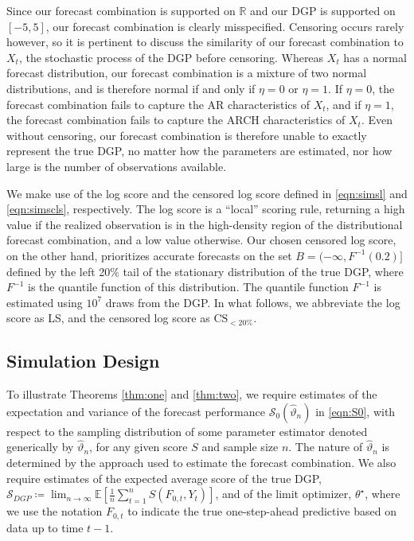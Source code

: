 \documentclass[12pt]{article}
\theoremstyle{definition}
\theoremstyle{remark}
\begin{document}
Since our forecast combination is supported on $\mathbb{R}$ and our DGP is supported on $[-5, 5]$, our forecast combination is clearly misspecified. Censoring occurs rarely however, so it is pertinent to discuss the similarity of our forecast combination to $X_t$, the stochastic process of the DGP before censoring. Whereas $X_t$ has a normal forecast distribution, our forecast combination is a mixture of two normal distributions, and is therefore normal if and only if $\eta = 0$ or $\eta = 1$. If $\eta = 0$, the forecast combination fails to capture the AR characteristics of $X_t$, and if $\eta = 1$, the forecast combination fails to capture the ARCH characteristics of $X_t$. Even without censoring, our forecast combination is therefore unable to exactly represent the true DGP, no matter how the parameters are estimated, nor how large is the number of observations available.

We make use of the log score and the censored log score defined in \eqref{eqn:simsl} and \eqref{eqn:simscls}, respectively. The log score is a ``local'' scoring rule, returning a high value if the realized observation is in the high-density region of the distributional forecast combination, and a low value otherwise. Our chosen censored log score, on the other hand, prioritizes accurate forecasts on the set $B = (-\infty, F^{-1}(0.2)]$ defined by the left 20\% tail of the stationary distribution of the true DGP, where $F^{-1}$ is the quantile function of this distribution. The quantile function $F^{-1}$ is estimated using $10^7$ draws from the DGP. In what follows, we abbreviate the log score as LS, and the censored log score as $\mathrm{CS}_{<20\%}$.

\subsection{Simulation Design}

To illustrate Theorems \ref{thm:one} and \ref{thm:two}, we require estimates of the expectation and variance of the forecast performance $\mathcal{S}_0(\hat{\vartheta}_n)$ in \eqref{eqn:S0}, with respect to the sampling distribution of some parameter estimator denoted generically by $\hat{\vartheta}_n$, for any given score $S$ and sample size $n$. The nature of $\hat{\vartheta}_n$ is determined by the approach used to estimate the forecast combination. We also require estimates of the expected average score of the true DGP, $\mathcal{S}_{DGP} \coloneqq \lim_{n \to \infty} \mathbb{E}[\frac{1}{n} \sum_{t=1}^n S(F_{0,t}, Y_t)]$, and of the limit optimizer, $\theta^{\star}$, where we use the notation $F_{0,t}$ to indicate the true one-step-ahead predictive based on data up to time $t-1$.
\end{document}
